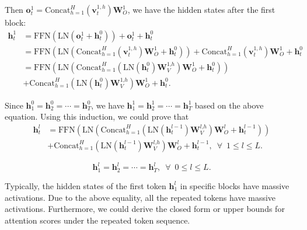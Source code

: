 Then $\boldsymbol{o}_t^1=\textrm{Concat}_{h=1}^H(\boldsymbol{v}_t^{1\textrm{,}\,h})\boldsymbol{W}_O^1$, we have the hidden states after the first block:
\begin{align}
    \boldsymbol{h}_t^1&=\textrm{FFN}(\textrm{LN}(\boldsymbol{o}_t^1+\boldsymbol{h}_t^0))+\boldsymbol{o}_t^1+\boldsymbol{h}_t^0\\
    &=\textrm{FFN}(\textrm{LN}(\textrm{Concat}_{h=1}^H(\boldsymbol{v}_t^{1\textrm{,}\,h})\boldsymbol{W}_O^1+\boldsymbol{h}_t^0))+\textrm{Concat}_{h=1}^H(\boldsymbol{v}_t^{1\textrm{,}\,h})\boldsymbol{W}_O^1+\boldsymbol{h}_t^0\\
    &=\textrm{FFN}(\textrm{LN}(\textrm{Concat}_{h=1}^H(\textrm{LN}(\boldsymbol{h}_t^{0})\boldsymbol{W}_{V}^{1\textrm{,}h})\boldsymbol{W}_O^1+\boldsymbol{h}_t^0))\\
    &+\textrm{Concat}_{h=1}^H(\textrm{LN}(\boldsymbol{h}_t^{0})\boldsymbol{W}_{V}^{1\textrm{,}h})\boldsymbol{W}_O^1+\boldsymbol{h}_t^0\textrm{.}
\end{align}

Since $\boldsymbol{h}_1^0=\boldsymbol{h}_2^0=\cdots=\boldsymbol{h}_T^0$, we have $\boldsymbol{h}_1^1=\boldsymbol{h}_2^1=\cdots=\boldsymbol{h}_T^1$ based on the above equation.  Using this induction, we could prove that
\begin{align}
    \boldsymbol{h}_t^l&=\textrm{FFN}(\textrm{LN}(\textrm{Concat}_{h=1}^H(\textrm{LN}(\boldsymbol{h}_t^{l-1})\boldsymbol{W}_{V}^{l\textrm{,}h})\boldsymbol{W}_O^l+\boldsymbol{h}_t^{l-1}))\\
    &+\textrm{Concat}_{h=1}^H(\textrm{LN}(\boldsymbol{h}_t^{l-1})\boldsymbol{W}_{V}^{l\textrm{,}h})\boldsymbol{W}_O^l+\boldsymbol{h}_t^{l-1}\textrm{,}\,\,\,\,\forall\,\,\, 1\leq l\leq L\textrm{.}
\end{align}

\begin{equation}
\boldsymbol{h}_1^l=\boldsymbol{h}_2^l=\cdots=\boldsymbol{h}_T^l\textrm{,}\,\,\,\,\forall\,\,\, 0\leq l\leq L\textrm{.}
\end{equation}

Typically, the hidden states of the first token $\boldsymbol{h}_1^l$ in specific blocks have massive activations. Due to the above equality, all the repeated tokens have massive activations. Furthermore, we could derive the closed form or upper bounds for attention scores under the repeated token sequence. 


